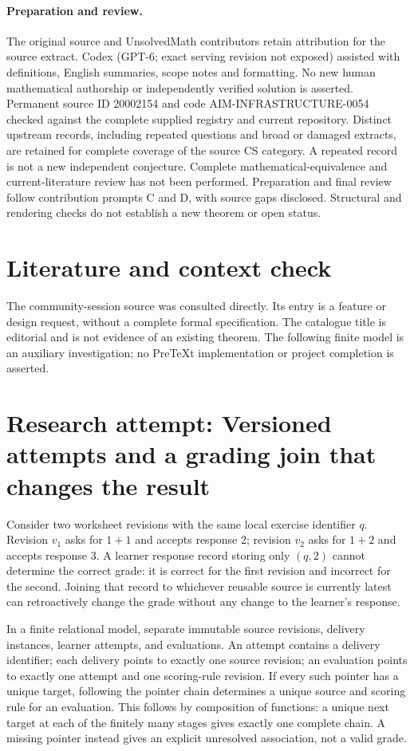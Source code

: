 \documentclass[11pt]{article}
\begin{document}
\paragraph{Preparation and review.}
The original source and UnsolvedMath contributors retain attribution for the source extract. Codex (GPT-6; exact serving revision not exposed) assisted with definitions, English summaries, scope notes and formatting. No new human mathematical authorship or independently verified solution is asserted. Permanent source ID 20002154 and code AIM-INFRASTRUCTURE-0054 checked against the complete supplied registry and current repository. Distinct upstream records, including repeated questions and broad or damaged extracts, are retained for complete coverage of the source CS category. A repeated record is not a new independent conjecture. Complete mathematical-equivalence and current-literature review has not been performed. Preparation and final review follow contribution prompts C and D, with source gaps disclosed. Structural and rendering checks do not establish a new theorem or open status.
\label{end:20002154}

\section{Literature and context check}
The community-session source was consulted directly. Its entry is a feature or design request, without a complete formal specification. The catalogue title is editorial and is not evidence of an existing theorem. The following finite model is an auxiliary investigation; no PreTeXt implementation or project completion is asserted.
\section{Research attempt: Versioned attempts and a grading join that changes the result}
Consider two worksheet revisions with the same local exercise identifier $q$. Revision $v_1$ asks for $1+1$ and accepts response 2; revision $v_2$ asks for $1+2$ and accepts response 3. A learner response record storing only $(q,2)$ cannot determine the correct grade: it is correct for the first revision and incorrect for the second. Joining that record to whichever reusable source is currently latest can retroactively change the grade without any change to the learner's response.

In a finite relational model, separate immutable source revisions, delivery instances, learner attempts, and evaluations. An attempt contains a delivery identifier; each delivery points to exactly one source revision; an evaluation points to exactly one attempt and one scoring-rule revision. If every such pointer has a unique target, following the pointer chain determines a unique source and scoring rule for an evaluation. This follows by composition of functions: a unique next target at each of the finitely many stages gives exactly one complete chain. A missing pointer instead gives an explicit unresolved association, not a valid grade.
\end{document}
